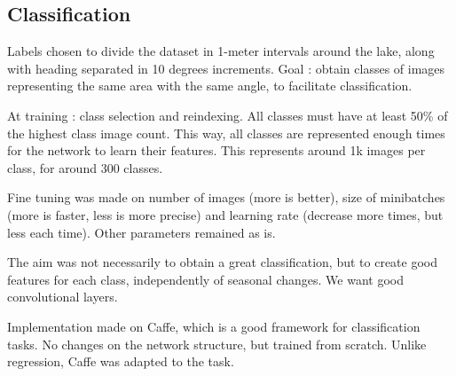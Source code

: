 \subsection{Classification}
Labels chosen to divide the dataset in 1-meter intervals around the lake, along with heading separated in 10 degrees increments. Goal : obtain classes of images representing the same area with the same angle, to facilitate classification.

At training : class selection and reindexing. All classes must have at least 50\% of the highest class image count. This way, all classes are represented enough times for the network to learn their features. This represents around 1k images per class, for around 300 classes.

Fine tuning was made on number of images (more is better), size of minibatches (more is faster, less is more precise) and learning rate (decrease more times, but less each time). Other parameters remained as is.

The aim was not necessarily to obtain a great classification, but to create good features for each class, independently of seasonal changes. We want good convolutional layers.

Implementation made on Caffe, which is a good framework for classification tasks. No changes on the network structure, but trained from scratch. Unlike regression, Caffe was adapted to the task.